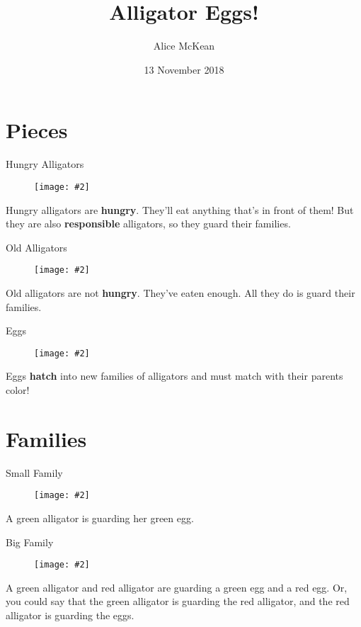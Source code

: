 \documentclass[usenames,dvipsnames]{beamer}
\title{Alligator Eggs!}
\date{13 November 2018}
\author{Alice McKean}
\institute{Reed Student Colloquium}
\newcommand{\pic}[2]{\texttt{[image: \#2]}}
\newcommand{\hungry}[0]{\textbf{hungry}}
\begin{document}
\maketitle

\section{Pieces}
\begin{frame}{Hungry Alligators}
  \begin{figure}
    \pic{0.9}{pieces/hungry_alligators.png}
  \end{figure}
  Hungry alligators are \hungry. They'll eat anything that's in front of them! But
  they are also \textbf{responsible} alligators, so they guard their families.
\end{frame}

\begin{frame}{Old Alligators}
  \begin{figure}
    \pic{0.8}{pieces/old_alligators.png}
  \end{figure}
  Old alligators are not \hungry. They've eaten enough.
  All they do is guard their families.
\end{frame} 

\begin{frame}{Eggs}
  \begin{figure}
    \pic{0.8}{pieces/egg.png}
  \end{figure}
  Eggs \textbf{hatch} into new families of alligators and must match with their parents color!
\end{frame} 

\section{Families}
\begin{frame}{Small Family}
  \begin{figure}
    \pic{0.4}{family/small.png}
  \end{figure}
  A green alligator is guarding her green egg.
\end{frame}

\begin{frame}{Big Family}
  \begin{figure}
    \pic{0.4}{family/big.png}
  \end{figure}
  A green alligator and red alligator are guarding a green egg and a red egg.
  Or, you could say that the green alligator is guarding the red alligator,
  and the red alligator is guarding the eggs.
\end{frame}
\end{document}
